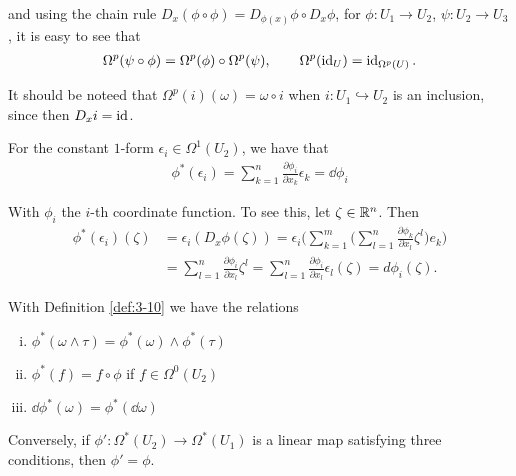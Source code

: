 and using the chain rule $D_x(\phi\circ\phi) = D_{\phi(x)}\phi\circ D_x\phi$, for $\phi:U_1\to U_2$, 
$\psi:U_2\to U_3$, it is easy to see that 
\begin{align*}
  \Omega^p(\psi\circ\phi) = \Omega^p(\phi)\circ\Omega^p(\psi),\qquad 
  \Omega^p(\operatorname{id}_U) = \operatorname{id}_{\Omega^p(U)}.
\end{align*}

It should be noteed that $\Omega^p(i)(\omega) = \omega\circ i$ when $i:U_1\hookrightarrow U_2$ is an inclusion, since 
then $D_xi = \operatorname{id}$.

\begin{example}\label{example:3-11}
  For the constant $1$-form $\epsilon_i\in\Omega^1(U_2)$, we have that
  \begin{align*}
    \phi^*(\epsilon_i) 
    = \sum_{k=1}^{n }{\frac{\partial \phi_i }{\partial x_k }\epsilon_k} 
    = \dd\phi_i
  \end{align*}
\end{example}

With $\phi_i$ the $i$-th coordinate function. To see this, let $\zeta\in\mathbb{R}^n$. Then 
\begin{align*}
  \phi^{*}(\epsilon_{i})(\zeta)
  & = \epsilon_{i}(D_{x}\phi(\zeta))
      = \epsilon_{i}\Bigg(\sum_{k=1}^{m}\Big(\sum_{l=1}^{n}\frac{\partial\phi_{k}}{\partial x_{l}}\zeta^{l}\Big)e_{k}\Bigg) \\
  & = \sum_{l=1}^{n}\frac{\partial\phi_{i}}{\partial x_{l}}\zeta^{l}
      =\sum_{l=1}^{n}\frac{\partial\phi_{i}}{\partial x_{l}}\epsilon_{l}(\zeta)=d\phi_{i}(\zeta).
\end{align*}

\begin{theorem}\label{theorem:3-12}
With Definition \ref{def:3-10} we have the relations
\begin{enumerate}[(i)]
  \item $\phi^*(\omega\wedge\tau) = \phi^*(\omega)\wedge\phi^*(\tau)$
  \item $\phi^*(f) = f\circ\phi$ if $f\in\Omega^0(U_2)$
  \item $\dd\phi^*(\omega) = \phi^*(\dd\omega)$
\end{enumerate}

Conversely, if $\phi':\Omega^*(U_2)\to\Omega^*(U_1)$ is a linear map satisfying three conditions, then $\phi'=\phi$.
\end{theorem}

